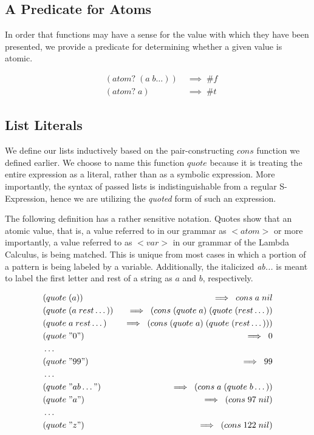 \subsection{A Predicate for Atoms}
In order that functions may have a sense for the value with which they have been 
presented, we provide a predicate for determining whether a given value is atomic.

\begin{figure}[htp]
\caption{}\label{scheme}
\begin{align*}
& (atom? \; (a \; b\dots)) \; &\implies \; \#f
\\& (atom? \; a) \; &\implies \; \#t
\end{align*}
\end{figure}

\subsection{List Literals}
We define our lists inductively based on the pair-constructing $cons$ function we 
defined earlier. We choose to name this function $quote$ because it is treating 
the entire expression as a literal, rather than as a symbolic expression. More 
importantly, the syntax of passed lists is indistinguishable from a regular 
S-Expression, hence we are utilizing the \emph{quoted} form of such an expression.

The following definition has a rather sensitive notation. Quotes show that an 
atomic value, that is, a value referred to in our grammar as $<atom>$ or more 
importantly, a value referred to as $<var>$ in our grammar of the Lambda Calculus, 
is being matched. This is unique from most cases in which a portion of a pattern 
is being labeled by a variable. Additionally, the italicized \emph{ab...} is meant to 
label the first letter and rest of a string as $a$ and $b$, respectively.

\begin{figure}[htp]
\caption{}\label{scheme}
\begin{align*}
& (quote \; (a)) \; &\implies \; cons \; a \; nil
\\& (quote \; (a \; rest\dots)) \; &\implies \; (cons \; (quote \; a) \; (quote \; (rest\dots))
\\& (quote \; a \; rest\dots) \; &\implies \; (cons \; (quote \; a) \; (quote \; (rest\dots)))
\\& (quote \; "0") \; &\implies \; 0
\\& \dots
\\& (quote \; "99") \; &\implies \; 99
\\& \dots
\\& (quote \; "ab\dots") \; &\implies \; (cons \; a \; (quote \; b\dots))
\\& (quote \; "a") \; &\implies \; (cons \; 97 \; nil)
\\& \dots
\\& (quote \; "z") \; &\implies \; (cons \; 122 \; nil)
\end{align*}
\end{figure}

